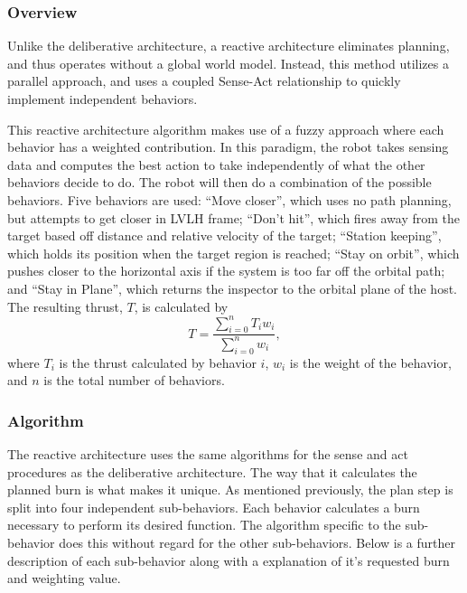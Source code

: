 \documentclass[journal, 10pt]{IEEEtran}
\begin{document}
\subsubsection{Overview}
Unlike the deliberative architecture, a reactive architecture eliminates planning, and thus operates without a global world model. Instead, this method utilizes a parallel approach, and uses a coupled Sense-Act relationship to quickly implement independent behaviors\cite{joshi}. 

This reactive architecture algorithm makes use of a fuzzy approach where each behavior has a weighted contribution. In this paradigm, the robot takes sensing data and computes the best action to take independently of what the other behaviors decide to do. The robot will then do a combination of the possible behaviors. Five behaviors are used: ``Move closer'', which uses no path planning, but attempts to get closer in LVLH frame; ``Don't hit'', which fires away from the target based off distance and relative velocity of the target; ``Station keeping'', which holds its position when the target region is reached; ``Stay on orbit'', which pushes closer to the horizontal axis if the system is too far off the orbital path; and ``Stay in Plane'', which returns the inspector to the orbital plane of the host. The resulting thrust, $T$, is calculated by
\begin{equation}
T = \frac{ \sum^{n}_{i=0} T_i w_i} { \sum^{n}_{i=0} w_i },
\end{equation}
where $T_i$ is the thrust calculated by behavior $i$, $w_i$ is the weight of the behavior, and $n$ is the total number of behaviors.

\subsubsection{Algorithm}
The reactive architecture uses the same algorithms for the sense and act procedures as the deliberative architecture.  The way that it calculates the planned burn is what makes it unique.  As mentioned previously, the plan step is split into four independent sub-behaviors.  Each behavior calculates a burn necessary to perform its desired function.  The algorithm specific to the sub-behavior does this without regard for the other sub-behaviors.  Below is a further description of each sub-behavior along with a explanation of it's requested burn and weighting value.
\end{document}
